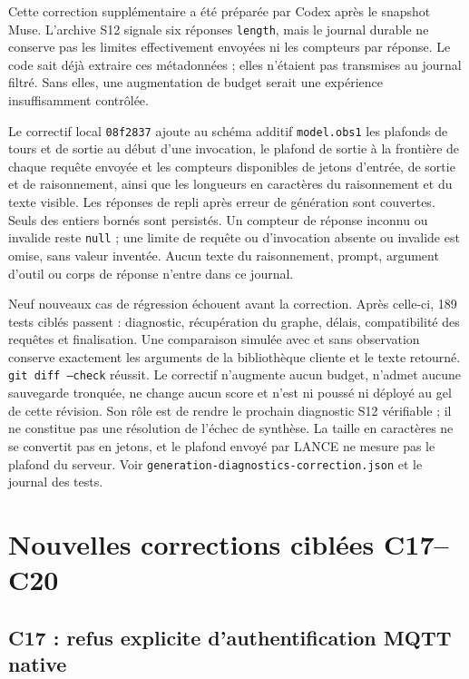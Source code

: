 \documentclass[11pt,a4paper]{article}
\newcommand{\code}[1]{{\urlstyle{tt}\nolinkurl{#1}}}
\begin{document}
Cette correction supplémentaire a été préparée par Codex après le snapshot Muse. L'archive S12 signale six réponses \code{length}, mais le journal durable ne conserve pas les limites effectivement envoyées ni les compteurs par réponse. Le code sait déjà extraire ces métadonnées ; elles n'étaient pas transmises au journal filtré. Sans elles, une augmentation de budget serait une expérience insuffisamment contrôlée.

Le correctif local \code{08f2837} ajoute au schéma additif \code{model.obs1} les plafonds de tours et de sortie au début d'une invocation, le plafond de sortie à la frontière de chaque requête envoyée et les compteurs disponibles de jetons d'entrée, de sortie et de raisonnement, ainsi que les longueurs en caractères du raisonnement et du texte visible. Les réponses de repli après erreur de génération sont couvertes. Seuls des entiers bornés sont persistés. Un compteur de réponse inconnu ou invalide reste \code{null} ; une limite de requête ou d'invocation absente ou invalide est omise, sans valeur inventée. Aucun texte du raisonnement, prompt, argument d'outil ou corps de réponse n'entre dans ce journal.

Neuf nouveaux cas de régression échouent avant la correction. Après celle-ci, 189 tests ciblés passent : diagnostic, récupération du graphe, délais, compatibilité des requêtes et finalisation. Une comparaison simulée avec et sans observation conserve exactement les arguments de la bibliothèque cliente et le texte retourné. \texttt{git diff --check} réussit. Le correctif n'augmente aucun budget, n'admet aucune sauvegarde tronquée, ne change aucun score et n'est ni poussé ni déployé au gel de cette révision. Son rôle est de rendre le prochain diagnostic S12 vérifiable ; il ne constitue pas une résolution de l'échec de synthèse. La taille en caractères ne se convertit pas en jetons, et le plafond envoyé par LANCE ne mesure pas le plafond du serveur. Voir \code{generation-diagnostics-correction.json} et le journal des tests.

\section{Nouvelles corrections ciblées C17--C20}
\subsection{C17 : refus explicite d'authentification MQTT native}
\label{sec:c17}
\end{document}
